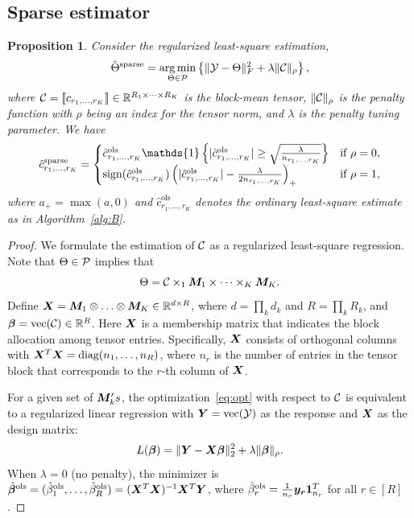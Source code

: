 \documentclass{article}
\newtheorem{prop}{Proposition}
\begin{document}
\begin{appendices}
\subsection{Sparse estimator}
\begin{prop}\label{prop:sparse}
Consider the regularized least-square estimation,
\begin{equation}\label{eq:opt}
\hat \Theta^{\text{sparse}}=\operatorname*{arg\,min}_{\Theta\in \mathcal{P}}\left\{\lVert\mathcal{Y}-\Theta\rVert_F^2+\lambda \lVert\mathcal{C}\rVert_\rho
\right\},
\end{equation}
where $\mathcal{C}=\llbracket c_{r_1,\ldots,r_K} \rrbracket\in\mathbb{R}^{R_1\times \cdots\times R_K}$ is the block-mean tensor, $\lVert\mathcal{C}\rVert_\rho$ is the penalty function with $\rho$ being an index for the tensor norm, and $\lambda$ is the penalty tuning parameter. We have
\begin{equation}\label{eq:lasso}
\hat c^{\text{sparse}}_{r_1,\ldots,r_K}=
\begin{cases}
\hat c^{\text{ols}}_{r_1,\ldots,r_K}\mathds{1}\left\{|\hat c^{\text{ols}}_{r_1,\ldots,r_K} |\geq {\sqrt{\lambda \over n_{r_1,\ldots,r_K}}}\right\} & \text{if}\ \rho=0,\\
\text{sign}(\hat c^{\text{ols}}_{r_1,\ldots,r_K})\left( |\hat c^{\text{ols}}_{r_1,\ldots,r_K}|-{\lambda \over 2n_{r_1,\ldots,r_K}}  \right)_{+} &\text{if}\ \rho=1,
\end{cases}
\end{equation}
where $a_{+}=\max(a,0)$ and $\hat c^{\text{ols}}_{r_1,\ldots,r_K}$ denotes the ordinary least-square estimate as in Algorithm~\ref{alg:B}. 
\end{prop}

\begin{proof}
We formulate the estimation of $\mathcal{C}$ as a regularized least-square regression. Note that $\Theta\in\mathcal{P}$ implies that
\[
\Theta=\mathcal{C}\times_1\bm M_1\times \cdots \times_K \bm M_K.
\]
Define $\bm X=\bm M_1\otimes \ldots \otimes \bm M_K\in \mathbb{R}^{d\times R}$, where $d=\prod_k d_k$ and $R=\prod_k R_k$, and ${\bm \beta}=\text{vec}(\mathcal{C})\in\mathbb{R}^R$. Here $\bm X$ is a membership matrix that indicates the block allocation among tensor entries. Specifically, $\bm X$ consists of orthogonal columns with $\bm X^T\bm X=\text{diag}(n_1,\ldots,n_R)$, where $n_r$ is the number of entries in the tensor block that corresponds to the $r$-th column of $\bm X$.

For a given set of $\bm M_k's$, the optimization~\eqref{eq:opt} with respect to $\mathcal{C}$ is equivalent to a regularized linear regression with $\bm Y=\text{vec}(\mathcal{Y})$ as the response and $\bm X$ as the design matrix:
\begin{equation}\label{eq:opt}
L({\bm \beta})=\lVert\bm Y-\bm X \bm{\beta}\rVert_2^2+\lambda\lVert\bm{\beta}\rVert_\rho.
\end{equation}
When $\lambda=0$ (no penalty), the minimizer is $\hat {\bm \beta}^{\text{ols}}=(\hat \beta^{\text{ols}}_1,\ldots,\hat \beta^{\text{ols}}_R)=(\bm X^T\bm X)^{-1}\bm X^T\bm Y$, where $\hat \beta^{\text{ols}}_r={1\over n_r}\bm{y}_{\bm{r}}\mathbf{1}^T_{n_r}$ for all $r\in[R]$.


\end{proof}
\end{appendices}
\end{document}
